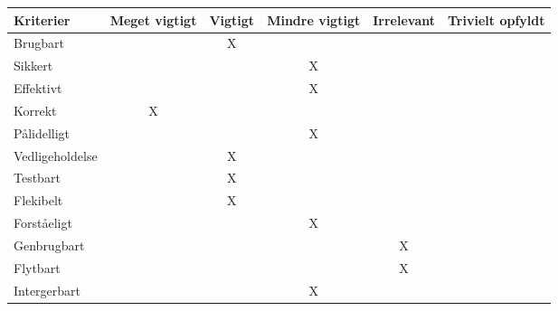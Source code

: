 \begin{table}[h]
\begin{tabular}{|l|c|c|c|c|c|}\hline
Kriterier       & Meget vigtigt & Vigtigt & Mindre vigtigt & Irrelevant & Trivielt opfyldt \\\hline
Brugbart        &               & X       &                &            &                  \\\hline
Sikkert         &               &         & X              &            &                  \\\hline
Effektivt       &               &         & X              &            &                  \\\hline
Korrekt         & X             &         &                &            &                  \\\hline
Pålidelligt     &               &         & X              &            &                  \\\hline
Vedligeholdelse &               & X       &                &            &                  \\\hline
Testbart        &               & X       &                &            &                  \\\hline
Flekibelt       &               & X       &                &            &                  \\\hline
Forståeligt     &               &         & X              &            &                  \\\hline
Genbrugbart     &               &         &                & X          &                  \\\hline
Flytbart        &               &         &                & X          &                  \\\hline
Intergerbart    &               &         & X              &            &                  \\\hline
\end{tabular}
\end{table}